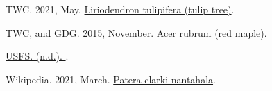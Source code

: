 \documentclass[
]{article}
\newlength{\cslhangindent}
\newlength{\cslentryspacingunit} %
\newenvironment{CSLReferences}[2] %
 {%
  \setlength{\parindent}{0pt}
  \ifodd #1
  \let\oldpar\par
  \def\par{\hangindent=\cslhangindent\oldpar}
  \fi
  \setlength{\parskip}{#2\cslentryspacingunit}
 }%
 {}
\begin{document}
\begin{CSLReferences}{1}{0}
\leavevmode{}%
TWC. 2021, May. \href{https://www.wildflower.org/plants/result.php?id_plant=LITU}{Liriodendron tulipifera (tulip tree)}.

\leavevmode{}%
TWC, and GDG. 2015, November. \href{https://www.wildflower.org/plants/result.php?id_plant=acru}{Acer rubrum (red maple)}.

\leavevmode{}%
\href{https://www.fs.fed.us/wildflowers/beauty/mycotrophic/monotropa_uniflora.shtml}{USFS. (n.d.). }.

\leavevmode{}%
Wikipedia. 2021, March. \href{https://en.wikipedia.org/w/index.php?title=Patera_clarki_nantahala\&oldid=1010217193}{Patera clarki nantahala}.

\end{CSLReferences}
\end{document}
